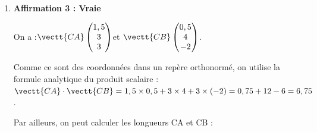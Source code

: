 \begin{enumerate}
\begin{enumerate}
			$\begin{aligned}
				\begin{cases}
					3-s = t\\
					s = -1,5 - t\\
					2 -5s = 2 - 2t
				\end{cases}
				&\iff \begin{cases}
					3-s = t\\
					s = -1,5 - (3 - s)\\
					2 -5s = 2 - 2(3 - s)
				\end{cases}\\
				&\iff \begin{cases}
					3-s = t\\
					s = -1,5 - 3 + s\\
					2 -5s = 2 - 6 + 2s
				\end{cases}\\
			\end{aligned} $

			Les équations du système sont incompatibles (la deuxième équation est équivaut à $0 = -4,5$).

			Le système n'a pas de solution.

			Il n'y a donc aucun point commun entre les droites (AB) et $(d)$, qui sont donc non coplanaires, et pas sécantes.

			\item \textbf{Affirmation 3 : Vraie}

			On a :\quad $\vectt{CA} \begin{pmatrix} 1,5\\3\\3 \end{pmatrix} $\quad et \quad $\vectt{CB} \begin{pmatrix} 0,5\\4\\-2 \end{pmatrix} $.

			Comme ce sont des coordonnées dans un repère orthonormé, on utilise la formule analytique du produit scalaire :\quad $\vectt{CA}\cdot\vectt{CB} = 1,5 \times 0,5 + 3 \times 4 + 3 \times (-2) = 0,75 + 12 - 6 = 6,75$.

			Par ailleurs, on peut calculer les longueurs CA et CB :


\end{enumerate}
\end{enumerate}

